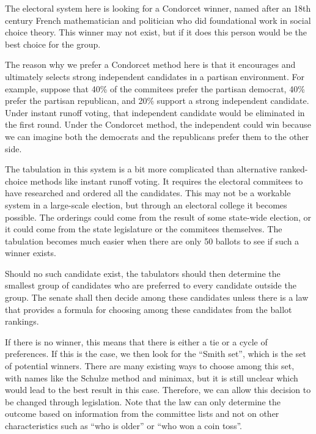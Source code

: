 \documentclass{article}
\begin{document}
The electoral system here is looking for a Condorcet winner, named after an 18th century French mathematician and politician who did foundational work in social choice theory. This winner may not exist, but if it does this person would be the best choice for the group.

The reason why we prefer a Condorcet method here is that it encourages and ultimately selects strong independent candidates in a partisan environment. For example, suppose that 40\% of the commitees prefer the partisan democrat, 40\% prefer the partisan republican, and 20\% support a strong independent candidate. Under instant runoff voting, that independent candidate would be eliminated in the first round. Under the Condorcet method, the independent could win because we can imagine both the democrats and the republicans prefer them to the other side.

The tabulation in this system is a bit more complicated than alternative ranked-choice methods like instant runoff voting. It requires the electoral commitees to have researched and ordered all the candidates. This may not be a workable system in a large-scale election, but through an electoral college it becomes possible. The orderings could come from the result of some state-wide election, or it could come from the state legislature or the commitees themselves. The tabulation becomes much easier when there are only 50 ballots to see if such a winner exists.

\begin{quoting}
Should no such candidate exist, the tabulators should then determine the smallest group of candidates who are preferred to every candidate outside the group. The senate shall then decide among these candidates unless there is a law that provides a formula for choosing among these candidates from the ballot rankings.
\end{quoting}

If there is no winner, this means that there is either a tie or a cycle of preferences. If this is the case, we then look for the “Smith set”, which is the set of potential winners. There are many existing ways to choose among this set, with names like the Schulze method\cite{Schulze} and minimax, but it is still unclear which would lead to the best result in this case. Therefore, we can allow this decision to be changed through legislation. Note that the law can only determine the outcome based on information from the committee lists and not on other characteristics such as “who is older” or “who won a coin toss”.
\end{document}
